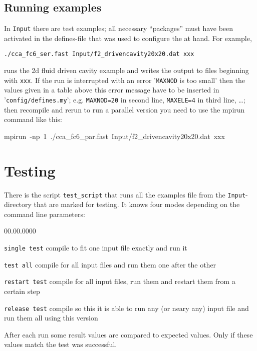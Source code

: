 \subsection{Running examples}\label{beginner:sec:running-examples}

In \texttt{Input} there are test examples; all necessary ``packages''
must have been activated in the defines-file that was used to configure
the \ccarat{} at hand. For example,

\texttt{./cca\_fc6\_ser.fast Input/f2\_drivencavity20x20.dat xxx }

runs the 2d fluid driven cavity example and writes the output to files
beginning with \texttt{xxx}. If the run is interrupted with an error
'\texttt{MAXNOD} is too small' then the values given in a table above
this error message have to be inserted in '\texttt{config/defines.my}';
e.g. \texttt{MAXNOD=20} in second line, \texttt{MAXELE=4} in third
line, \ldots; then recompile and rerun to run a parallel version you
need to use the mpirun command like this:

\begin{lyxcode}
mpirun~-np~1~./cca\_fc6\_par.fast~Input/f2\_drivencavity20x20.dat~xxx
\end{lyxcode}

\section{Testing}

There is the script \texttt{test\_script} that runs all the examples
file from the \texttt{Input}-directory that are marked for testing.
It knows four modes depending on the command line parameters:

\begin{lyxlist}{00.00.0000}
\item [{\texttt{single~test}}] compile \ccarat{} to fit one input file
exactly and run it
\item [{\texttt{test~all}}] compile \ccarat{} for all input files and
run them one after the other
\item [{\texttt{restart~test}}] compile \ccarat{} for all input files,
run them and restart them from a certain step
\item [{\texttt{release~test}}] compile \ccarat{} so this it is able
to run any (or neary any) input file and run them all using this version
\end{lyxlist}
After each run some result values are compared to expected values.
Only if these values match the test was successful.

